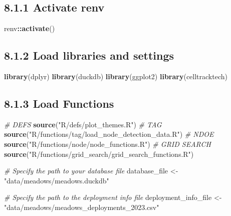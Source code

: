 \documentclass[
]{book}
\newenvironment{Shaded}{\begin{snugshade}}{\end{snugshade}}
\newcommand{\CommentTok}[1]{\textcolor[rgb]{0.56,0.35,0.01}{\textit{#1}}}
\newcommand{\FunctionTok}[1]{\textcolor[rgb]{0.13,0.29,0.53}{\textbf{#1}}}
\newcommand{\NormalTok}[1]{#1}
\newcommand{\OtherTok}[1]{\textcolor[rgb]{0.56,0.35,0.01}{#1}}
\newcommand{\SpecialCharTok}[1]{\textcolor[rgb]{0.81,0.36,0.00}{\textbf{#1}}}
\newcommand{\StringTok}[1]{\textcolor[rgb]{0.31,0.60,0.02}{#1}}
\begin{document}
\subsection{8.1.1 Activate renv}\label{activate-renv}

\begin{Shaded}
\begin{Highlighting}[]
\NormalTok{renv}\SpecialCharTok{::}\FunctionTok{activate}\NormalTok{()}
\end{Highlighting}
\end{Shaded}

\subsection{8.1.2 Load libraries and settings}\label{load-libraries-and-settings-1}

\begin{Shaded}
\begin{Highlighting}[]
\FunctionTok{library}\NormalTok{(dplyr)}
\FunctionTok{library}\NormalTok{(duckdb)}
\FunctionTok{library}\NormalTok{(ggplot2)}
\FunctionTok{library}\NormalTok{(celltracktech)}
\end{Highlighting}
\end{Shaded}

\subsection{8.1.3 Load Functions}\label{load-functions-1}

\begin{Shaded}
\begin{Highlighting}[]
\CommentTok{\# DEFS}
\FunctionTok{source}\NormalTok{(}\StringTok{"R/defs/plot\_themes.R"}\NormalTok{)}
\CommentTok{\# TAG}
\FunctionTok{source}\NormalTok{(}\StringTok{"R/functions/tag/load\_node\_detection\_data.R"}\NormalTok{)}
\CommentTok{\# NDOE}
\FunctionTok{source}\NormalTok{(}\StringTok{"R/functions/node/node\_functions.R"}\NormalTok{)}
\CommentTok{\# GRID SEARCH}
\FunctionTok{source}\NormalTok{(}\StringTok{"R/functions/grid\_search/grid\_search\_functions.R"}\NormalTok{)}

\CommentTok{\# Specify the path to your database file}
\NormalTok{database\_file }\OtherTok{\textless{}{-}} \StringTok{"data/meadows/meadows.duckdb"}

\CommentTok{\# Specify the path to the deployment info file}
\NormalTok{deployment\_info\_file }\OtherTok{\textless{}{-}} \StringTok{"data/meadows/meadows\_deployments\_2023.csv"}
\end{Highlighting}
\end{Shaded}
\end{document}
